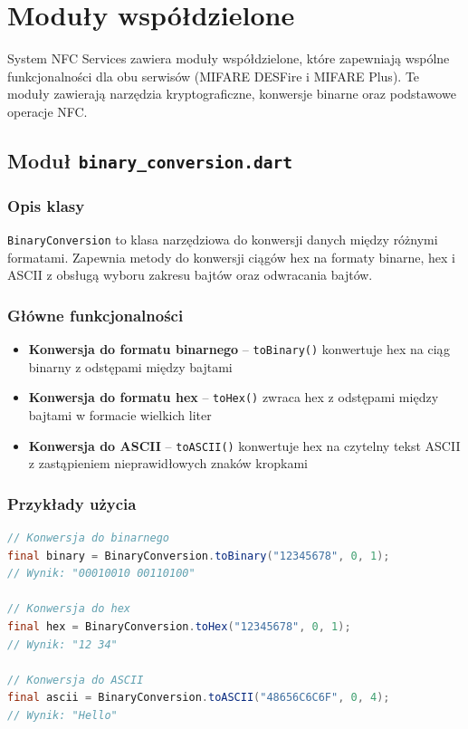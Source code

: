 \documentclass[a4paper,12pt]{article}
\begin{document}
\newpage

\section{Moduły współdzielone}

System NFC Services zawiera moduły współdzielone, które zapewniają wspólne funkcjonalności dla obu serwisów (MIFARE DESFire i MIFARE Plus). Te moduły zawierają narzędzia kryptograficzne, konwersje binarne oraz podstawowe operacje NFC.

\subsection{Moduł \texttt{binary\_conversion.dart}}

\subsubsection{Opis klasy}
\texttt{BinaryConversion} to klasa narzędziowa do konwersji danych między różnymi formatami. Zapewnia metody do konwersji ciągów hex na formaty binarne, hex i ASCII z obsługą wyboru zakresu bajtów oraz odwracania bajtów.

\subsubsection{Główne funkcjonalności}
\begin{itemize}
    \item \textbf{Konwersja do formatu binarnego} -- \texttt{toBinary()} konwertuje hex na ciąg binarny z odstępami między bajtami
    \item \textbf{Konwersja do formatu hex} -- \texttt{toHex()} zwraca hex z odstępami między bajtami w formacie wielkich liter
    \item \textbf{Konwersja do ASCII} -- \texttt{toASCII()} konwertuje hex na czytelny tekst ASCII z zastąpieniem nieprawidłowych znaków kropkami
\end{itemize}

\subsubsection{Przykłady użycia}
\begin{lstlisting}[language=Java]
// Konwersja do binarnego
final binary = BinaryConversion.toBinary("12345678", 0, 1);
// Wynik: "00010010 00110100"

// Konwersja do hex
final hex = BinaryConversion.toHex("12345678", 0, 1);
// Wynik: "12 34"

// Konwersja do ASCII
final ascii = BinaryConversion.toASCII("48656C6C6F", 0, 4);
// Wynik: "Hello"

\end{lstlisting}
\end{document}
